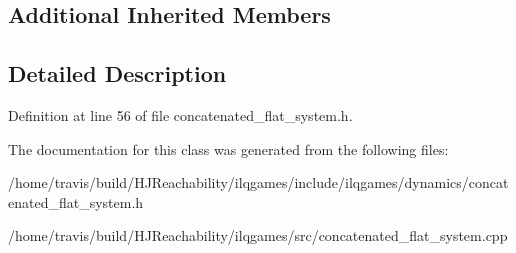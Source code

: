 \subsection*{Additional Inherited Members}


\subsection{Detailed Description}


Definition at line 56 of file concatenated\+\_\+flat\+\_\+system.\+h.



The documentation for this class was generated from the following files\+:\begin{DoxyCompactItemize}
\item 
/home/travis/build/\+H\+J\+Reachability/ilqgames/include/ilqgames/dynamics/concatenated\+\_\+flat\+\_\+system.\+h\item 
/home/travis/build/\+H\+J\+Reachability/ilqgames/src/concatenated\+\_\+flat\+\_\+system.\+cpp\end{DoxyCompactItemize}
